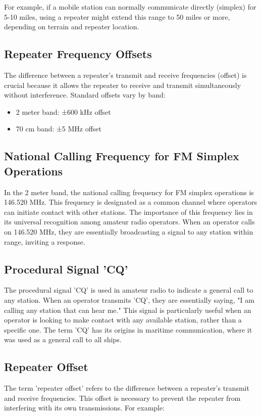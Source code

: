 For example, if a mobile station can normally communicate directly (simplex) for 5-10 miles, using a repeater might extend this range to 50 miles or more, depending on terrain and repeater location.

\subsection*{Repeater Frequency Offsets}
The difference between a repeater's transmit and receive frequencies (offset) is crucial because it allows the repeater to receive and transmit simultaneously without interference. Standard offsets vary by band:
\begin{itemize}
    \item 2 meter band: ±600 kHz offset
    \item 70 cm band: ±5 MHz offset
\end{itemize}

\subsection*{National Calling Frequency for FM Simplex Operations}
In the 2 meter band, the national calling frequency for FM simplex operations is 146.520 MHz. This frequency is designated as a common channel where operators can initiate contact with other stations. The importance of this frequency lies in its universal recognition among amateur radio operators. When an operator calls on 146.520 MHz, they are essentially broadcasting a signal to any station within range, inviting a response.

\subsection*{Procedural Signal 'CQ'}
The procedural signal 'CQ' is used in amateur radio to indicate a general call to any station. When an operator transmits 'CQ', they are essentially saying, "I am calling any station that can hear me." This signal is particularly useful when an operator is looking to make contact with any available station, rather than a specific one. The term 'CQ' has its origins in maritime communication, where it was used as a general call to all ships.

\subsection*{Repeater Offset}
The term 'repeater offset' refers to the difference between a repeater's transmit and receive frequencies. This offset is necessary to prevent the repeater from interfering with its own transmissions. For example:

